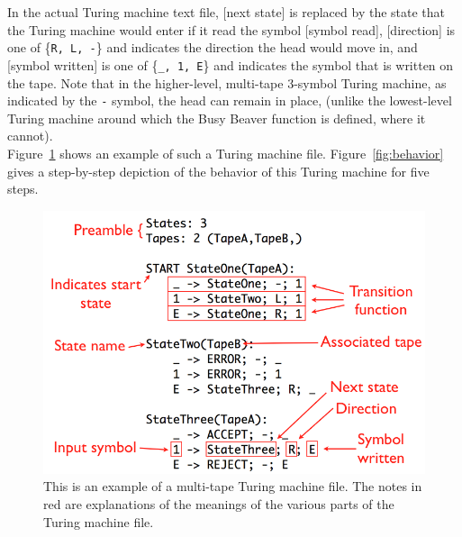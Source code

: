 \documentclass[11pt]{report}
\begin{document}
In the actual Turing machine text file, [next state] is replaced by the state that the Turing machine would enter if it read the symbol [symbol read], [direction] is one of \{\texttt{R, L, -}\} and indicates the direction the head would move in, and [symbol written] is one of \{\texttt{\_, 1, E}\} and indicates the symbol that is written on the tape. Note that in the higher-level, multi-tape 3-symbol Turing machine, as indicated by the \texttt{-} symbol, the head can remain in place, (unlike the lowest-level Turing machine around which the Busy Beaver function is defined, where it cannot). \\

Figure~\ref{fig:tmexample} shows an example of such a Turing machine file. Figure~\ref{fig:behavior} gives a step-by-step depiction of the behavior of this Turing machine for five steps. \\

\begin{figure} 
\begin{center} 
\includegraphics[scale=0.4]{figs/annotatedtm.png} 
\caption{This is an example of a multi-tape Turing machine file. The notes in red are explanations of the meanings of the various parts of the Turing machine file. \label{fig:tmexample}} 
\end{center} 
\end{figure}
\end{document}
